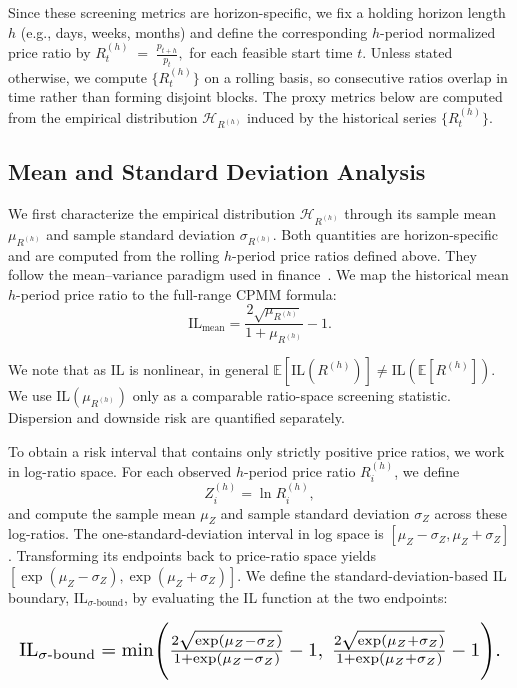 \documentclass[10pt,conference,compsocconf]{IEEEtran}
\begin{document}
{Since these screening metrics are horizon-specific, we fix a holding horizon length $h$ (e.g., days, weeks, months) and define the corresponding $h$-period normalized price ratio by}
\(
    R^{(h)}_{t} \;=\; \frac{p_{t+h}}{p_t},
\)
{for each feasible start time $t$. Unless stated otherwise, we compute $\{R^{(h)}_{t}\}$ on a rolling basis, so consecutive ratios overlap in time rather than forming disjoint blocks. The proxy metrics below are computed from the empirical distribution $\mathcal{H}_{R^{(h)}}$ induced by the historical series $\{R^{(h)}_{t}\}$.}

\subsection{Mean and Standard Deviation Analysis}
We first characterize the empirical distribution $\mathcal{H}_{R^{(h)}}$ through its sample mean $\mu_{R^{(h)}}$ and sample standard deviation $\sigma_{R^{(h)}}$. Both quantities are horizon-specific and are computed from the rolling $h$-period price ratios defined above. They follow the mean--variance paradigm used in finance~\cite{markowitz1952portfolio,ross2014introduction}.
We map the historical mean $h$-period price ratio to the full-range CPMM formula:
\begin{equation}
\label{eq:il_mean}
\mathrm{IL}_{\text{mean}} = \frac{2\sqrt{\mu_{R^{(h)}}}}{1+\mu_{R^{(h)}}} - 1.
\end{equation}

We note that as $\mathrm{IL}$ is nonlinear, in general
$\mathbb{E}[\mathrm{IL}(R^{(h)})] \neq \mathrm{IL}(\mathbb{E}[R^{(h)}])$.
We use $\mathrm{IL}(\mu_{R^{(h)}})$ only as a comparable ratio-space screening statistic. Dispersion and downside risk are quantified separately.

To obtain a risk interval that contains only strictly positive price ratios, we work in log-ratio space. For each observed $h$-period price ratio $R_i^{(h)}$, we define
\[
Z_i^{(h)}=\ln R_i^{(h)},
\]
and compute the sample mean $\mu_Z$ and sample standard deviation $\sigma_Z$ across these log-ratios. The one-standard-deviation interval in log space is $[\mu_Z-\sigma_Z,\mu_Z+\sigma_Z]$. Transforming its endpoints back to price-ratio space yields $[\exp(\mu_Z-\sigma_Z),\exp(\mu_Z+\sigma_Z)]$. We define the standard-deviation-based IL boundary, $\mathrm{IL}_{\sigma\text{-bound}}$, by evaluating the IL function at the two endpoints:

\begin{equation}
\label{eq:il_sigma_bound}
\resizebox{\linewidth}{!}{$%
\mathrm{IL}_{\sigma\text{-bound}}
= \min\Biggl(
\frac{2\sqrt{\exp(\mu_{Z} - \sigma_{Z})}}{1+\exp(\mu_{Z} - \sigma_{Z})} - 1,\;
\frac{2\sqrt{\exp(\mu_{Z} + \sigma_{Z})}}{1+\exp(\mu_{Z} + \sigma_{Z})} - 1
\Biggr).
$}
\end{equation}
\end{document}
